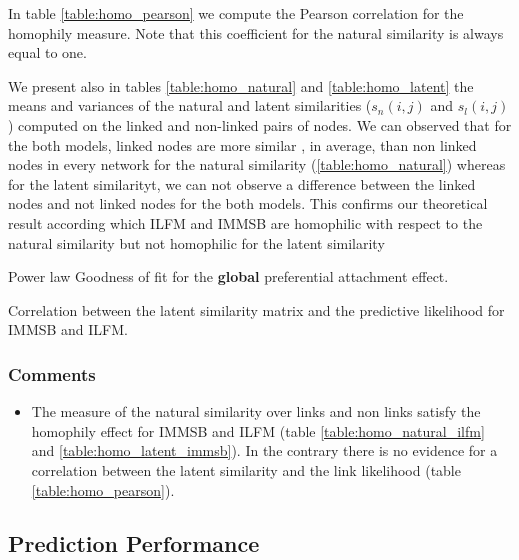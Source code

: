\documentclass[a4paper, 12pt]{article}
\begin{document}
In table \ref{table:homo_pearson} we compute the Pearson correlation for the homophily measure. Note that this coefficient for the natural similarity is always equal to one.

We present also in tables \ref{table:homo_natural} and \ref{table:homo_latent} the means and variances of the natural and latent similarities ($s_n(i,j)$ and $s_l(i,j)$) computed on the linked and non-linked pairs of nodes. We can observed that for the both models,  linked nodes are more similar , in average, than non linked nodes in every network for the natural similarity (\ref{table:homo_natural})  whereas for the latent similarityt, we can not observe a  difference between the linked nodes and not linked nodes for the both models. This confirms our theoretical result according which ILFM and IMMSB are homophilic with respect to the natural similarity but not homophilic for the latent similarity
%
%
\begin{table}
    \caption{Power law Goodness of fit for the \textbf{global} preferential attachment effect.}
\centering


    \label{table:homo_contingency}
\end{table}

\begin{table}[h]
    \caption{Correlation between the latent similarity matrix and the predictive likelihood for IMMSB and ILFM.}
    \centering
    
    \label{table:homo_pearson}
\end{table}


\subsubsection{Comments}
\begin{itemize}
    \item The measure of the natural similarity over links and non links satisfy the homophily effect for IMMSB and ILFM (table \ref{table:homo_natural_ilfm} and \ref{table:homo_latent_immsb}). In the contrary there is no evidence for a correlation between the latent similarity and the link likelihood (table \ref{table:homo_pearson}). 
\end{itemize}


\subsection{Prediction Performance}
\end{document}
